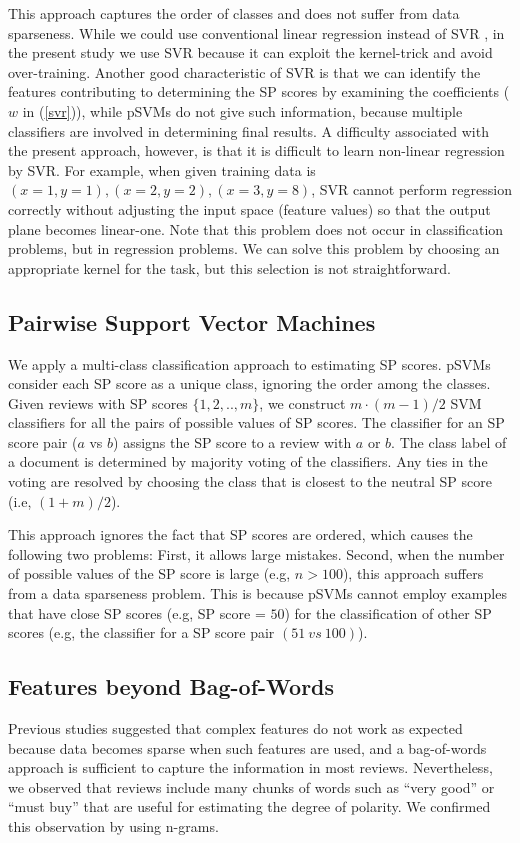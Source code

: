 \documentclass[japanese]{jnlp_1.3d}
\begin{document}
This approach captures the order of classes and does not suffer from data sparseness. While we could use conventional linear regression instead of SVR \cite{Trevor2001}, in the present study we use SVR because it can exploit the kernel-trick and avoid over-training. Another good characteristic of SVR is that we can identify the features contributing to determining the SP scores by examining the coefficients ($w$ in (\ref{svr})), while pSVMs do not give such information, because multiple classifiers are involved in determining final results.
A difficulty associated with the present approach, however, is that it is difficult to learn non-linear regression by SVR. For example, when given training data is $(x = 1, y = 1), (x = 2, y = 2), (x = 3, y = 8)$, SVR cannot perform regression correctly without adjusting the input space (feature values) so that the output plane becomes linear-one. Note that this problem does not occur in classification problems, but in regression problems. We can solve this problem by choosing an appropriate kernel for the task, but this selection is not straightforward.



\subsection{Pairwise Support Vector Machines}
\label{sec:svm}
We apply a multi-class classification approach to estimating SP scores. pSVMs \cite{Kresel1999} consider each SP score as a unique class, ignoring the order among the classes. Given reviews with SP scores $\{1,2,..,m\}$, we construct $m \cdot (m-1) / 2$ SVM classifiers for all the pairs of possible values of SP scores. The classifier for an SP score pair ($a$ vs $b$) assigns the SP score to a review with $a$ or $b$. The class label of a document is determined by majority voting of the classifiers. Any ties in the voting are resolved by choosing the class that is closest to the neutral SP score (i.e, $(1+m)/2$).

This approach ignores the fact that SP scores are ordered, which causes the following two problems: First, it allows large mistakes. Second, when the number of possible values of the SP score is large (e.g, $n > 100$), this approach suffers from a data sparseness problem. This is because pSVMs cannot employ examples that have close SP scores (e.g, SP score = $50$) for the classification of other SP scores (e.g, the classifier for a SP score pair $(51\ vs\ 100)$).

\subsection{Features beyond Bag-of-Words}
\label{step1}
Previous studies \cite{Lewis1992,Apte94} suggested that complex features do not work as expected because data becomes sparse when such features are used, and a bag-of-words approach is sufficient to capture the information in most reviews. Nevertheless, we observed that reviews include many chunks of words such as ``very good'' or ``must buy'' that are useful for estimating the degree of polarity. We confirmed this observation by using n-grams.
\end{document}
